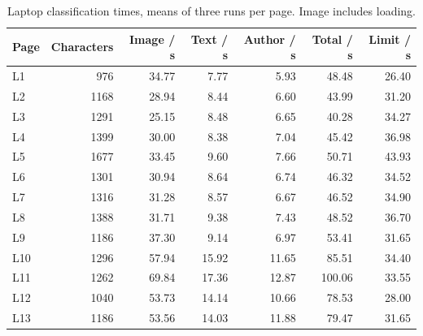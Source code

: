 \begin{table}[H]\centering\small
\begin{tabular}{lrrrrrr}\toprule
Page & Characters & Image / s & Text / s & Author / s & Total / s & Limit / s\\\midrule
L1 & 976 & 34.77 & 7.77 & 5.93 & 48.48 & 26.40\\
L2 & 1168 & 28.94 & 8.44 & 6.60 & 43.99 & 31.20\\
L3 & 1291 & 25.15 & 8.48 & 6.65 & 40.28 & 34.27\\
L4 & 1399 & 30.00 & 8.38 & 7.04 & 45.42 & 36.98\\
L5 & 1677 & 33.45 & 9.60 & 7.66 & 50.71 & 43.93\\
L6 & 1301 & 30.94 & 8.64 & 6.74 & 46.32 & 34.52\\
L7 & 1316 & 31.28 & 8.57 & 6.67 & 46.52 & 34.90\\
L8 & 1388 & 31.71 & 9.38 & 7.43 & 48.52 & 36.70\\
L9 & 1186 & 37.30 & 9.14 & 6.97 & 53.41 & 31.65\\
L10 & 1296 & 57.94 & 15.92 & 11.65 & 85.51 & 34.40\\
L11 & 1262 & 69.84 & 17.36 & 12.87 & 100.06 & 33.55\\
L12 & 1040 & 53.73 & 14.14 & 10.66 & 78.53 & 28.00\\
L13 & 1186 & 53.56 & 14.03 & 11.88 & 79.47 & 31.65\\
\bottomrule\end{tabular}
\caption{Laptop classification times, means of three runs per page. Image includes loading.}\label{tab:res-laptop-times}\end{table}
